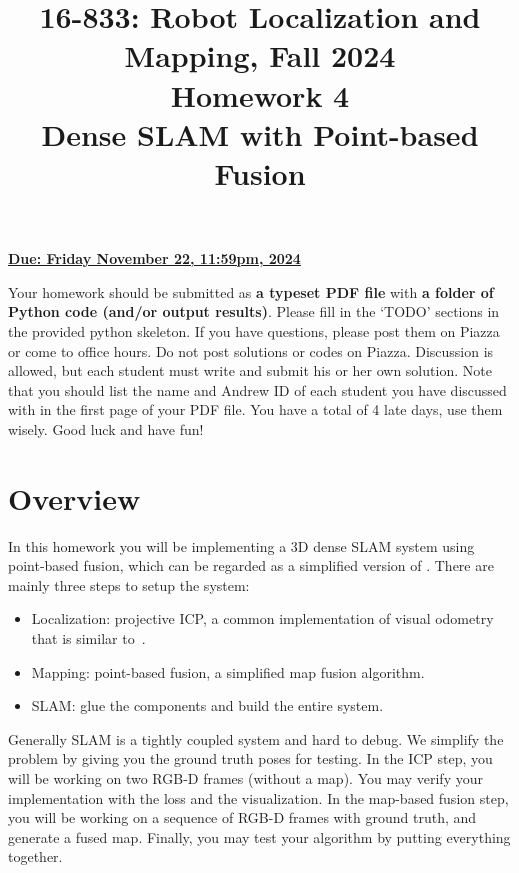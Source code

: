 \documentclass[12pt, a4paper]{article}
\date{}
\begin{document}
\title{\Large 16-833: Robot Localization and Mapping, Fall 2024\\
	\textbf{\Large Homework 4 \\ Dense SLAM with Point-based Fusion}}
\maketitle
\begin{flushright}
	\textbf{\uline{Due: Friday November 22, 11:59pm, 2024}}
	\par\end{flushright}


Your homework should be submitted as \textbf{a typeset PDF file} with
\textbf{a folder of Python code (and/or output results)}. Please fill in the `TODO' sections in the provided python skeleton.
If you have questions, please post them on Piazza
or come to office hours. Do not post solutions or codes on Piazza.
Discussion is allowed, but each student must write and submit his
or her own solution. Note that you should list the name and Andrew
ID of each student you have discussed with in the first page of your
PDF file. You have a total of 4 late days, use them wisely. Good luck
and have fun!


\section{Overview}

In this homework you will be implementing a 3D dense SLAM system using point-based fusion, which can be regarded as a simplified version of \cite{fusion}. There are mainly three steps to setup the system:
\begin{itemize}
	\item Localization: projective ICP, a common implementation of visual odometry that is similar to~\cite{icp}.
	\item Mapping: point-based fusion, a simplified map fusion algorithm.
	\item SLAM: glue the components and build the entire system.
\end{itemize}
Generally SLAM is a tightly coupled system and hard to debug. We simplify the problem by giving you the ground truth poses for testing. In the ICP step, you will be working on two RGB-D frames (without a map). You may verify your implementation with the loss and the visualization.
In the map-based fusion step, you will be working on a sequence of RGB-D frames with ground truth, and generate a fused map. Finally, you may test your algorithm by putting everything together.
\end{document}
